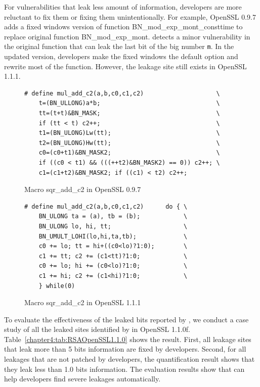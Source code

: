 For vulnerabilities that leak less amount of information,
developers are more reluctant to fix them or fixing them unintentionally. For example, OpenSSL 0.9.7 adds a fixed windows version of function \textsf{BN\_mod\_exp\_mont\_consttime} to replace original function \textsf{BN\_mod\_exp\_mont}.
\tool{} detects a minor vulnerability in the original function that can leak the last bit of the big number \texttt{m}. In the updated version, developers make the fixed windows the default option and rewrite most of the function. However, the leakage site still exists in OpenSSL 1.1.1.
\begin{figure}
    \centering
    \begin{lstlisting}[xleftmargin=.08\textwidth, xrightmargin=.0\textwidth, frame=none]
# define mul_add_c2(a,b,c0,c1,c2)                    \
    t=(BN_ULLONG)a*b;                                \
    tt=(t+t)&BN_MASK;                                \
    if (tt < t) c2++;                                \
    t1=(BN_ULONG)Lw(tt);                             \
    t2=(BN_ULONG)Hw(tt);                             \
    c0=(c0+t1)&BN_MASK2;                             \
    if ((c0 < t1) && (((++t2)&BN_MASK2) == 0)) c2++; \
    c1=(c1+t2)&BN_MASK2; if ((c1) < t2) c2++;
\end{lstlisting}
    \caption{Macro \textsf{sqr\_add\_c2} in OpenSSL 0.9.7}
    \label{fig:old_sqr2}
\end{figure}


\begin{figure}
    \centering
    \begin{lstlisting}[xleftmargin=.08\textwidth, xrightmargin=.0\textwidth, frame=none]
# define mul_add_c2(a,b,c0,c1,c2)      do { \
    BN_ULONG ta = (a), tb = (b);            \
    BN_ULONG lo, hi, tt;                    \
    BN_UMULT_LOHI(lo,hi,ta,tb);             \
    c0 += lo; tt = hi+((c0<lo)?1:0);        \
    c1 += tt; c2 += (c1<tt)?1:0;            \
    c0 += lo; hi += (c0<lo)?1:0;            \
    c1 += hi; c2 += (c1<hi)?1:0;            \
    } while(0)
\end{lstlisting}
\caption{Macro \textsf{sqr\_add\_c2} in OpenSSL 1.1.1}
\label{fig:new_sqr2}
\end{figure}

To evaluate the effectiveness of the leaked bits reported by \tool{}, we conduct a case study of all the leaked sites identified by \tool{} in OpenSSL 1.1.0f. Table~\ref{chapter4:tab:RSAOpenSSL1.1.0} shows the result. First, all leakage sites that leak more than 5 bits information are fixed by developers. Second, for all leakages that are not patched by developers, the quantification result shows that they leak less than 1.0 bits information. The evaluation results show that \tool{} can help developers find severe leakages automatically.

